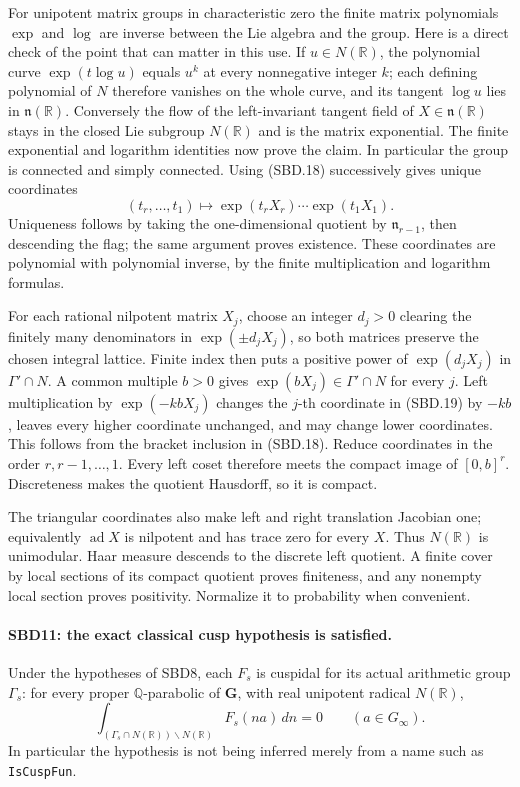 \documentclass[11pt,a4paper]{article}
\numberwithin{equation}{section}
\theoremstyle{remark}\newtheorem{remark}[theorem]{Remark}
\begin{document}
For unipotent matrix groups in characteristic zero the finite
matrix polynomials \(\exp\) and \(\log\) are inverse between
the Lie algebra and the group.  Here is a direct check of the
point that can matter in this use.  If \(u\in N(\mathbb R)\),
the polynomial curve \(\exp(t\log u)\) equals \(u^k\) at
every nonnegative integer \(k\); each defining polynomial of
\(N\) therefore vanishes on the whole curve, and its tangent
\(\log u\) lies in \(\mathfrak n(\mathbb R)\).  Conversely
the flow of the left-invariant tangent field of
\(X\in\mathfrak n(\mathbb R)\) stays in the closed Lie
subgroup \(N(\mathbb R)\) and is the matrix exponential.
The finite exponential and logarithm identities now prove the
claim.  In particular the group is connected and simply
connected.  Using (SBD.18) successively gives unique coordinates
\[
 (t_r,\ldots,t_1)\longmapsto
        \exp(t_rX_r)\cdots\exp(t_1X_1).
 \tag{SBD.19}
\]
Uniqueness follows by taking the one-dimensional quotient by
\(\mathfrak n_{r-1}\), then descending the flag; the same
argument proves existence.  These coordinates are polynomial
with polynomial inverse, by the finite multiplication and
logarithm formulas.

For each rational nilpotent matrix \(X_j\), choose an integer
\(d_j>0\) clearing the finitely many denominators in
\(\exp(\pm d_jX_j)\), so both matrices preserve the chosen
integral lattice.  Finite index then puts a positive power of
\(\exp(d_jX_j)\) in \(\Gamma'\cap N\).  A common multiple
\(b>0\) gives \(\exp(bX_j)\in\Gamma'\cap N\) for every
\(j\).  Left multiplication by \(\exp(-kbX_j)\) changes the
\(j\)-th coordinate in (SBD.19) by \(-kb\), leaves every
higher coordinate unchanged, and may change lower coordinates.
This follows from the bracket inclusion in (SBD.18).
Reduce coordinates in the order \(r,r-1,\ldots,1\).
Every left coset therefore meets the compact image of
\([0,b]^r\).  Discreteness makes the quotient Hausdorff, so
it is compact.

The triangular coordinates also make left and right translation
Jacobian one; equivalently \(\operatorname{ad}X\) is nilpotent
and has trace zero for every \(X\).  Thus \(N(\mathbb R)\)
is unimodular.  Haar measure descends to the discrete left
quotient.  A finite cover by local sections of its compact
quotient proves finiteness, and any nonempty local section
proves positivity.  Normalize it to probability when convenient.

\paragraph{SBD11: the exact classical cusp hypothesis is satisfied.}
\label{claim:SBD11}
Under the hypotheses of SBD8, each \(F_s\) is cuspidal for its
actual arithmetic group \(\Gamma_s\): for every proper
\(\mathbb Q\)-parabolic of \(\mathbf G\), with real unipotent
radical \(N(\mathbb R)\),
\[
 \int_{(\Gamma_s\cap N(\mathbb R))\backslash N(\mathbb R)}
          F_s(na)\,dn=0\qquad(a\in G_\infty).
 \tag{SBD.20}
\]
In particular the hypothesis is not being inferred merely
from a name such as \texttt{Is\allowbreak Cusp\allowbreak Fun}.
\end{document}
